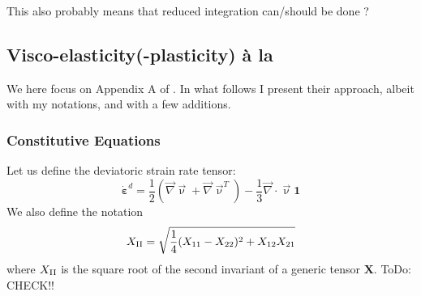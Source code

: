This also probably means that reduced integration can/should be done ?


\subsection{Visco-elasticity(-plasticity) {\`a} la \textcite{bafg20}}

We here focus on Appendix A of \textcite{bafg20}. 
In what follows I present their approach, albeit with my notations, 
and with a few additions. 

\subsubsection{Constitutive Equations}


Let us define the deviatoric strain rate tensor:
\begin{equation}
\dot{\bm\varepsilon}^d 
= \frac12 (\vec\nabla \vec\upnu + \vec\nabla \vec\upnu ^T  ) 
- \frac13 \vec\nabla \cdot \vec\upnu {\bm 1} \label{bafg20_A3} 
\end{equation}
We also define the notation
\begin{equation}
X_{\rm II}  = \sqrt{ \frac14 (X_{11}-X_{22})^2 + X_{12}  X_{21}    }\label{bafg20_A4} 
\end{equation}
where $X_{\rm II}$ is the square root of the second invariant of a generic tensor ${\bm X}$.
ToDo: CHECK!!

